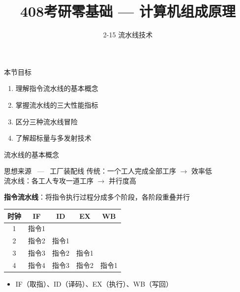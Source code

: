 \documentclass[10pt, aspectratio=169]{beamer}
\title{408考研零基础 --- 计算机组成原理}
\subtitle{2-15 流水线技术}
\author{}
\date{}
\begin{document}
\begin{frame}{本节目标}
    \begin{enumerate}
        \item 理解指令流水线的基本概念
        \item 掌握流水线的三大性能指标
        \item 区分三种流水线冒险
        \item 了解超标量与多发射技术
    \end{enumerate}
\end{frame}

\begin{frame}{流水线的基本概念}
    \begin{block}{思想来源 \ --- \ 工厂装配线}
        传统：一个工人完成全部工序 $\rightarrow$ 效率低 \\
        流水线：各工人专攻一道工序 $\rightarrow$ 并行度高
    \end{block}
    \vspace{0.3em}
    \textbf{指令流水线}：将指令执行过程分成多个阶段，各阶段重叠并行
    \vspace{0.3em}
    \begin{center}
        \begin{tabular}{|c|c|c|c|c|}
            \hline
            时钟 & IF & ID & EX & WB \\
            \hline
            1 & 指令1 &  &  &  \\
            2 & 指令2 & 指令1 &  &  \\
            3 & 指令3 & 指令2 & 指令1 &  \\
            4 & 指令4 & 指令3 & 指令2 & 指令1 \\
            \hline
        \end{tabular}
    \end{center}
    \vspace{0.3em}
    \begin{itemize}
        \item IF（取指）、ID（译码）、EX（执行）、WB（写回）
    \end{itemize}
\end{frame}
\end{document}
